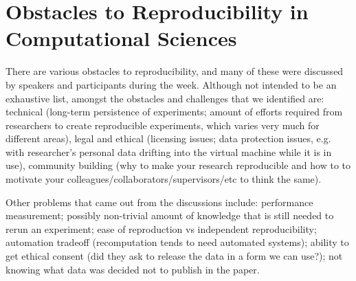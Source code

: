 \section{Obstacles to Reproducibility in Computational Sciences}
\label{s:obstacles}

There are various obstacles to reproducibility, and many of these were discussed by speakers and participants during the week. 
Although not intended to be an exhaustive list,  amongst the obstacles and challenges that we identified are:
technical (long-term persistence of experiments; amount of efforts required from researchers to create reproducible experiments, 
which varies very much for different areas), 
legal and ethical (licensing issues; data protection issues, e.g. with researcher's personal data drifting into the virtual machine 
while it is in use), 
community building (why to make your research reproducible and how to to motivate your colleagues/collaborators/supervisors/etc 
to think the same). 

Other problems that came out from the discussions include:
performance measurement; 
possibly non-trivial amount of knowledge that is still needed to rerun an experiment;
ease of reproduction vs independent reproducibility; 
automation tradeoff (recomputation tends to need automated systems);
ability to get ethical consent (did they ask to release the data in a form we can use?); 
not knowing what data was decided not to 
publish in the paper.



